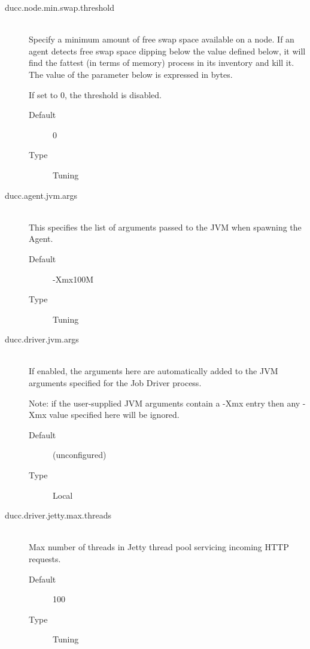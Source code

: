 \begin{description}
       \item[ducc.node.min.swap.threshold] \hfill \\
         Specify a minimum amount of free swap space available on a node.
         If an agent detects free swap space dipping below the value defined
         below, it will find the fattest (in terms of memory) process in its
         inventory and kill it. The value of the parameter below is expressed
         in bytes.

         If set to 0, the threshold is disabled.
         \begin{description}
           \item[Default] 0
           \item[Type] Tuning
         \end{description}


       \item[ducc.agent.jvm.args] \hfill \\
         This specifies the list of arguments passed to the JVM when spawning the Agent. 
         \begin{description}           
           \item[Default] -Xmx100M 
           \item[Type] Tuning 
         \end{description}


       \item[ducc.driver.jvm.args] \hfill \\
         If enabled, the arguments here are automatically added to the JVM arguments specified for 
         the Job Driver process. 

         Note: if the user-supplied JVM arguments contain a -Xmx entry then 
         any -Xmx value specified here will be ignored.
         \begin{description}
           \item[Default] (unconfigured) 
           \item[Type] Local 
         \end{description}

       \item[ducc.driver.jetty.max.threads] \hfill \\
         Max number of threads in Jetty thread pool servicing incoming  HTTP requests. 
         \begin{description}
           \item[Default] 100
           \item[Type] Tuning
         \end{description}


\end{description}
